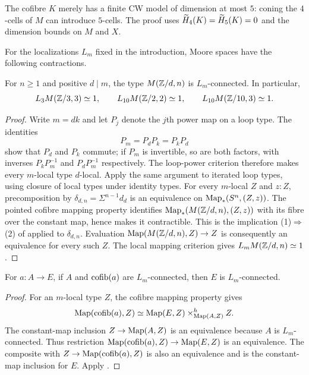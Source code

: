 \begin{remark}
The cofibre $K$ merely has a finite CW model of dimension at most $5$: coning the $4$-cells of $M$ can introduce $5$-cells. The proof uses $\widetilde H_4(K)=\widetilde H_5(K)=0$ and the dimension bounds on $M$ and $X$.
\end{remark}

For the localizations $L_m$ fixed in the introduction, Moore spaces have the following contractions.

\begin{corollary}\label{cor:moore-null}
For $n\geq1$ and positive $d\mid m$, the type $M(\mathbb Z/d,n)$ is $L_m$-connected. In particular,
\begin{equation}\label{eq:needed-moore-null}
L_3M(\mathbb Z/3,3)\simeq1,\qquad
L_{10}M(\mathbb Z/2,2)\simeq1,\qquad
L_{10}M(\mathbb Z/10,3)\simeq1.
\end{equation}
\end{corollary}
\begin{proof}
Write $m=dk$ and let $P_j$ denote the $j$th power map on a loop type. The identities
\[
P_m=P_dP_k=P_kP_d
\]
show that $P_d$ and $P_k$ commute; if $P_m$ is invertible, so are both factors, with inverses $P_kP_m^{-1}$ and $P_dP_m^{-1}$ respectively. The loop-power criterion \cite[Lemma~4.2]{cors} therefore makes every $m$-local type $d$-local. Apply the same argument to iterated loop types, using closure of local types under identity types. For every $m$-local $Z$ and $z:Z$, precomposition by $\delta_{d,n}=\Sigma^{n-1}d_d$ is an equivalence on $\operatorname{Map}_*(S^n,(Z,z))$. The pointed cofibre mapping property identifies $\operatorname{Map}_*(M(\mathbb Z/d,n),(Z,z))$ with its fibre over the constant map, hence makes it contractible. This is the implication (1)$\Rightarrow$(2) of \cite[Theorem~3.6]{cors} applied to $\delta_{d,n}$. Evaluation $\operatorname{Map}(M(\mathbb Z/d,n),Z)\to Z$ is consequently an equivalence for every such $Z$. The local mapping criterion \cite[Lemma~2.9]{cors} gives $L_mM(\mathbb Z/d,n)\simeq1$.
\end{proof}

\begin{lemma}\label{lem:two-stage-null}
For $a:A\to E$, if $A$ and $\operatorname{cofib}(a)$ are $L_m$-connected, then $E$ is $L_m$-connected.
\end{lemma}
\begin{proof}
For an $m$-local type $Z$, the cofibre mapping property gives
\[
\operatorname{Map}(\operatorname{cofib}(a),Z)\simeq
\operatorname{Map}(E,Z)\mathbin{\times}^{h}_{\operatorname{Map}(A,Z)}Z.
\]
The constant-map inclusion $Z\to\operatorname{Map}(A,Z)$ is an equivalence because $A$ is $L_m$-connected. Thus restriction $\operatorname{Map}(\operatorname{cofib}(a),Z)\to\operatorname{Map}(E,Z)$ is an equivalence. The composite with $Z\to\operatorname{Map}(\operatorname{cofib}(a),Z)$ is also an equivalence and is the constant-map inclusion for $E$. Apply \cite[Lemma~2.9]{cors}.
\end{proof}

